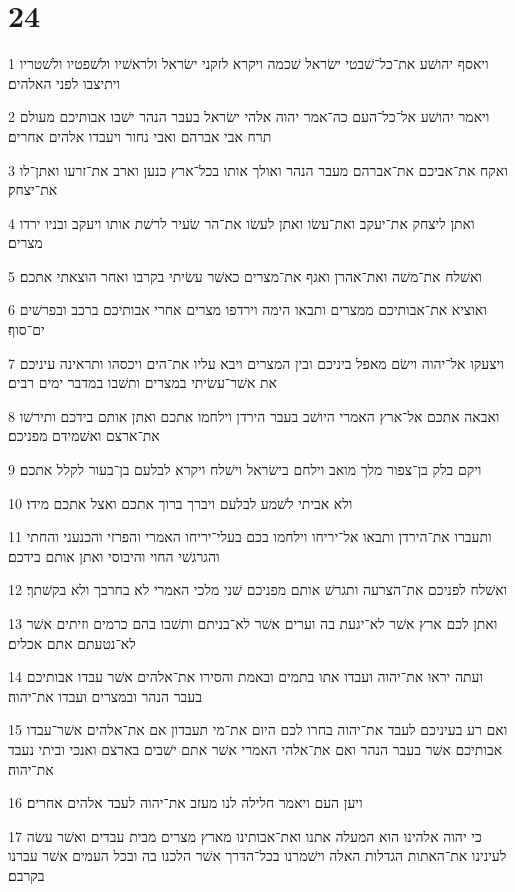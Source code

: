 \chapter{24}

\par 1 ויאסף יהושׁע את־כל־שׁבטי ישׂראל שׁכמה ויקרא לזקני ישׂראל ולראשׁיו ולשׁפטיו ולשׁטריו ויתיצבו לפני האלהים׃
\par 2 ויאמר יהושׁע אל־כל־העם כה־אמר יהוה אלהי ישׂראל בעבר הנהר ישׁבו אבותיכם מעולם תרח אבי אברהם ואבי נחור ויעבדו אלהים אחרים׃
\par 3 ואקח את־אביכם את־אברהם מעבר הנהר ואולך אותו בכל־ארץ כנען וארב את־זרעו ואתן־לו את־יצחק׃
\par 4 ואתן ליצחק את־יעקב ואת־עשׂו ואתן לעשׂו את־הר שׂעיר לרשׁת אותו ויעקב ובניו ירדו מצרים׃
\par 5 ואשׁלח את־משׁה ואת־אהרן ואגף את־מצרים כאשׁר עשׂיתי בקרבו ואחר הוצאתי אתכם׃
\par 6 ואוציא את־אבותיכם ממצרים ותבאו הימה וירדפו מצרים אחרי אבותיכם ברכב ובפרשׁים ים־סוף׃
\par 7 ויצעקו אל־יהוה וישׂם מאפל ביניכם ובין המצרים ויבא עליו את־הים ויכסהו ותראינה עיניכם את אשׁר־עשׂיתי במצרים ותשׁבו במדבר ימים רבים׃
\par 8 ואבאה אתכם אל־ארץ האמרי היושׁב בעבר הירדן וילחמו אתכם ואתן אותם בידכם ותירשׁו את־ארצם ואשׁמידם מפניכם׃
\par 9 ויקם בלק בן־צפור מלך מואב וילחם בישׂראל וישׁלח ויקרא לבלעם בן־בעור לקלל אתכם׃
\par 10 ולא אביתי לשׁמע לבלעם ויברך ברוך אתכם ואצל אתכם מידו׃
\par 11 ותעברו את־הירדן ותבאו אל־יריחו וילחמו בכם בעלי־יריחו האמרי והפרזי והכנעני והחתי והגרגשׁי החוי והיבוסי ואתן אותם בידכם׃
\par 12 ואשׁלח לפניכם את־הצרעה ותגרשׁ אותם מפניכם שׁני מלכי האמרי לא בחרבך ולא בקשׁתך׃
\par 13 ואתן לכם ארץ אשׁר לא־יגעת בה וערים אשׁר לא־בניתם ותשׁבו בהם כרמים וזיתים אשׁר לא־נטעתם אתם אכלים׃
\par 14 ועתה יראו את־יהוה ועבדו אתו בתמים ובאמת והסירו את־אלהים אשׁר עבדו אבותיכם בעבר הנהר ובמצרים ועבדו את־יהוה׃
\par 15 ואם רע בעיניכם לעבד את־יהוה בחרו לכם היום את־מי תעבדון אם את־אלהים אשׁר־עבדו אבותיכם אשׁר בעבר הנהר ואם את־אלהי האמרי אשׁר אתם ישׁבים בארצם ואנכי וביתי נעבד את־יהוה׃
\par 16 ויען העם ויאמר חלילה לנו מעזב את־יהוה לעבד אלהים אחרים׃
\par 17 כי יהוה אלהינו הוא המעלה אתנו ואת־אבותינו מארץ מצרים מבית עבדים ואשׁר עשׂה לעינינו את־האתות הגדלות האלה וישׁמרנו בכל־הדרך אשׁר הלכנו בה ובכל העמים אשׁר עברנו בקרבם׃
